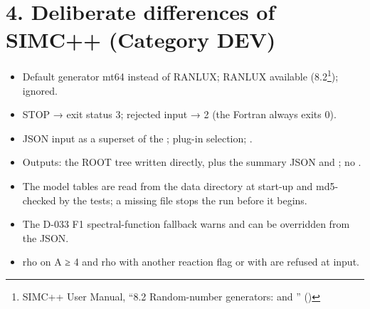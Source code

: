 \section*{\texorpdfstring{4. Deliberate differences of SIMC++ (Category DEV)}{4. Deliberate differences of SIMC++ (Category DEV)}}\label{translation_report-useru5fdifferences:4-deliberate-differences-of-simc-category-dev}
\begin{itemize}
\item Default generator mt64 instead of RANLUX; RANLUX available (8.2\footnote{SIMC++ User Manual, ``8.2 Random-number generators:  and '' ()});  ignored.
\item STOP → exit status 3; rejected input → 2 (the Fortran always exits 0).
\item JSON input as a superset of the ; plug-in selection; .
\item Outputs: the ROOT tree written directly, plus the summary JSON and ; no .
\item The model tables are read from the data directory at start-up and md5-checked by the tests; a missing file stops the run
before it begins.
\item The D-033 F1 spectral-function fallback warns and can be overridden from the JSON.
\item rho on A ≥ 4 and rho with another reaction flag or with  are refused at input.
\end{itemize}
